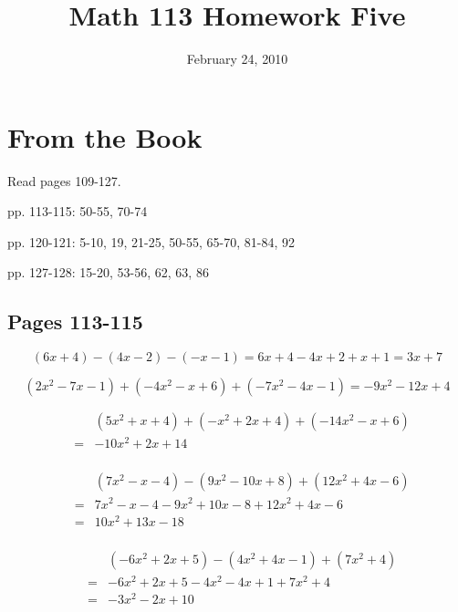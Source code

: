 \documentclass[fleqn,addpoints]{exam}
\title{Math 113 Homework Five}
\author{}
\date{February 24, 2010}
\begin{document}
\maketitle

\section{From the Book}

Read pages 109-127.

pp. 113-115: 50-55, 70-74

pp. 120-121: 5-10, 19, 21-25, 50-55, 65-70, 81-84, 92

pp. 127-128: 15-20, 53-56, 62, 63, 86

\ifprintanswers
\begin{description}

\subsection{Pages 113-115}

\item[50]
\[ (6x + 4) - (4x - 2) - (-x - 1) = 6x + 4 - 4x + 2 + x + 1  =  3x + 7 \]

\item[51]
\[ (2x^2 - 7x - 1) + (-4x^2 - x + 6) + (-7x^2 - 4x - 1) = -9x^2 -12x + 4 \]

\item[52]
\begin{eqnarray*}
&& (5x^2 + x + 4) + (-x^2 + 2x + 4) + (-14x^2 - x + 6)  \\
&=& -10x^2 + 2x + 14 \\
\end{eqnarray*}

\item[53]
\begin{eqnarray*}
&& (7x^2 - x - 4) - (9x^2 - 10x + 8) + (12x^2 + 4x - 6) \\
&=&  7x^2 - x - 4 - 9x^2 + 10x - 8 + 12x^2 + 4x - 6 \\
&=& 10x^2 + 13x -18 \\
\end{eqnarray*}

\item[54]
\begin{eqnarray*}
 && (-6x^2 + 2x  +5) - (4x^2 + 4x - 1) + (7x^2 + 4) \\
 &=& -6x^2 + 2x  + 5 - 4x^2 - 4x + 1 + 7x^2 + 4 \\
 &=& -3x^2 - 2x + 10 \\
\end{eqnarray*}


\end{description}
\end{document}
